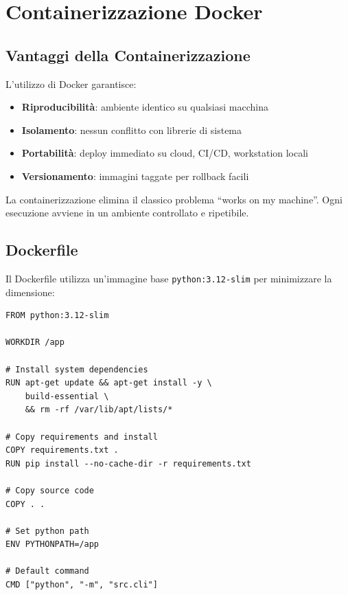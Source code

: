 \chapter{Containerizzazione Docker}

\section{Vantaggi della Containerizzazione}

L'utilizzo di Docker garantisce:

\begin{itemize}
    \item \textbf{Riproducibilità}: ambiente identico su qualsiasi macchina
    \item \textbf{Isolamento}: nessun conflitto con librerie di sistema
    \item \textbf{Portabilità}: deploy immediato su cloud, CI/CD, workstation locali
    \item \textbf{Versionamento}: immagini taggate per rollback facili
\end{itemize}

\begin{tipbox}
La containerizzazione elimina il classico problema ``works on my machine''. Ogni esecuzione avviene in un ambiente controllato e ripetibile.
\end{tipbox}

\section{Dockerfile}

Il Dockerfile utilizza un'immagine base \texttt{python:3.12-slim} per minimizzare la dimensione:

\begin{lstlisting}[language=docker, caption=Dockerfile]
FROM python:3.12-slim

WORKDIR /app

# Install system dependencies
RUN apt-get update && apt-get install -y \
    build-essential \
    && rm -rf /var/lib/apt/lists/*

# Copy requirements and install
COPY requirements.txt .
RUN pip install --no-cache-dir -r requirements.txt

# Copy source code
COPY . .

# Set python path
ENV PYTHONPATH=/app

# Default command
CMD ["python", "-m", "src.cli"]
\end{lstlisting}

